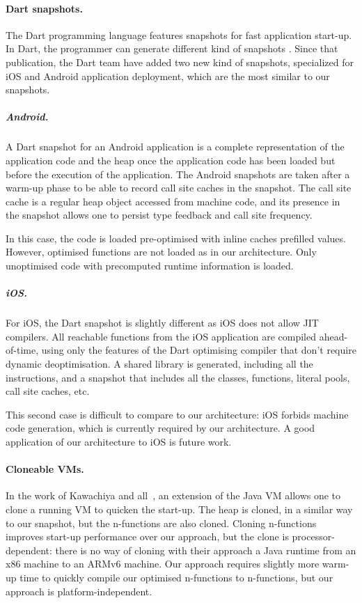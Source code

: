 \documentclass[a4paper,12pt,twoside]{../includes/ThesisStyle}
\begin{document}
\paragraph{Dart snapshots.}

The Dart programming language features snapshots for fast application start-up. In Dart, the programmer can generate different kind of snapshots \cite{Anna13a}. Since that publication, the Dart team have added two new kind of snapshots, specialized for iOS and Android application deployment, which are the most similar to our snapshots.

\subparagraph{Android.} A Dart snapshot for an Android application is a complete representation of the application code and the heap once the application code has been loaded but before the execution of the application. The Android snapshots are taken after a warm-up phase to be able to record call site caches in the snapshot. The call site cache is a regular heap object accessed from machine code, and its presence in the snapshot allows one to persist type feedback and call site frequency.

In this case, the code is loaded pre-optimised with inline caches prefilled values. However, optimised functions are not loaded as in our architecture. Only unoptimised code with precomputed runtime information is loaded.

\subparagraph{iOS.} For iOS, the Dart snapshot is slightly different as iOS does not allow JIT compilers. All reachable functions from the iOS application are compiled ahead-of-time, using only the features of the Dart optimising compiler that don't require dynamic deoptimisation. A shared library is generated, including all the instructions, and a snapshot that includes all the classes, functions, literal pools, call site caches, etc.

This second case is difficult to compare to our architecture: iOS forbids machine code generation, which is currently required by our architecture. A good application of our architecture to iOS is future work.

\paragraph{Cloneable VMs.}

In the work of Kawachiya and all~\cite{Kawa07a}, an extension of the Java VM allows one to clone a running VM to quicken the start-up. The heap is cloned, in a similar way to our snapshot, but the n-functions are also cloned. Cloning n-functions improves start-up performance over our approach, but the clone is processor-dependent: there is no way of cloning with their approach a Java runtime from an x86 machine to an ARMv6 machine. Our approach requires slightly more warm-up time to quickly compile our optimised n-functions to n-functions, but our approach is platform-independent.
\end{document}
